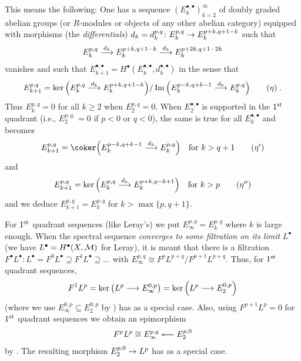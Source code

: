 \documentclass[a4paper,parskip=half,numbers=enddot, DIV=12]{scrreprt}
\renewcommand{\geq}{\geqslant}
\begin{document}
This means the following: One has a sequence $\left(E_k^{\bullet,\bullet}\right)_{k=2}^\infty$ of doubly graded abelian groups (or $R$-modules or objects of any other abelian category) equipped with morphisms (the \emph{differentials}) $d_k=d_k^{p,q}\colon E_k^{p,q}\morphism E_k^{p+k,q+1-k}$ such that 
\begin{align*}
	E_k^{p,q}\morphism[d_k]E_k^{p+k,q+1-k}\morphism[d_k]E_k^{p+2k,q+1-2k}
\end{align*}
vanishes and such that $E_{k+1}^{\bullet,\bullet}=H^\bullet (E_k^{\bullet,\bullet},d_k^{\bullet,\bullet})$ in the sense that
\begin{align}\lbl{eq:eta}
	E_{k+1}^{p,q}=\ker\Big(E_k^{p,q}\morphism[d_k]E_k^{p+k,q+1-k}\Big)/\Im\Big(E_k^{p-k,q+k-1}\morphism[d_k]E_k^{p,q}\Big)\tag{$\eta$}\;.
\end{align}
Thus $E_k^{p,q}=0$ for all $k\geq 2$ when $E_2^{p,q}=0$. When $E_2^{\bullet,\bullet}$ is supported in the $1^{\text{st}}$ quadrant (i.e., $E_2^{p,q,}=0$ if $p<0$ or $q<0$), the same is true for all $E_k^{\bullet,\bullet}$ and  becomes
\begin{align}\lbl{eq:eta'}
	E_{k+1}^{p,q}=\coker\Big(E_k^{p-k,q+k-1}\morphism[d_k]E_k^{p,q}\Big)\quad\text{for }k>q+1\tag{$\eta'$}
\end{align}
and 
\begin{align}\lbl{eq:eta''}
	E_{k+1}^{p,q}=\ker\Big(E_k^{p,q}\morphism[d_k]E_k^{p+k,q-k+1}\Big)\quad\text{for }k>p\tag{$\eta''$}
\end{align}
and we deduce $E_{k+1}^{p,q}=E_k^{p,q}$ for $k>\max\{p,q+1\}$.

For $1^{\text{st}}$ quadrant sequences (like Leray's) we put $E_\infty^{p,q}=E_k^{p,q}$ where $k$ is large enough. When the spectral sequence \emph{converges to some filtration on its limit} $L^\bullet $ (we have $L^\bullet =H^\bullet (X,\mathcal{M})$ for Leray), it is meant that there is a filtration $F^\bullet L^\bullet \colon L^\bullet =F^0L^\bullet \supseteq F^1L^\bullet\supseteq \ldots$ with $E_\infty^{p,q}\cong F^pL^{p+q}/F^{p+1}L^{p+q}$. Thus, for $1^{\text{st}}$ quadrant sequences,
\begin{align*}
	F^1L^p=\ker\left(L^p\morphism E_\infty^{0,p}\right)=\ker\Big(L^p\morphism E_2^{0,p}\Big)
\end{align*}
(where we use $E_\infty^{0,p}\subseteq E_2^{0,p}$ by ) has  as a special case. Also, using $F^{p+1}L^p=0$ for $1^{\text{st}}$ quadrant sequences we obtain an epimorphism
\begin{align*}
	F^pL^p\cong E_\infty^{p,q}\lepimorphism E_2^{p,0}
\end{align*}
by . The resulting morphism $E_2^{p,0}\morphism L^p$ has  as a special case.
\end{document}

